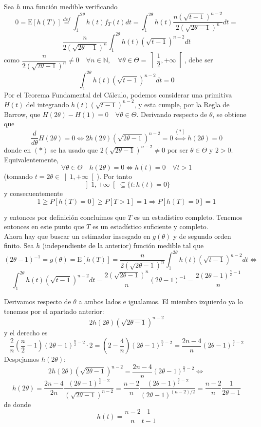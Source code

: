 \documentclass[12pt]{article}
\newcommand{\E}{\mathrm{E}}
\newcommand{\N}{\mathbb{N}}
\begin{document}
\begin{ejercicio}[2,25 puntos]
\begin{enumerate}
            Sea $h$ una función medible verificando $$0 = \E[h(T)] \stackrel{def}{=} \int_{1}^{2 \theta} h(t) f_T(t) dt = 
            \int_{1}^{2 \theta} h(t) \dfrac{n(\sqrt{t-1})^{n-2}}{2(\sqrt{2\theta-1})^{n}} dt =$$
            $$\dfrac{n}{2(\sqrt{2\theta-1})^{n}} \int_{1}^{2 \theta} h(t) (\sqrt{t-1})^{n-2} dt$$
            como $\dfrac{n}{2(\sqrt{2\theta-1})^{n}} \neq 0 \quad \forall n \in \N, \quad \forall \theta \in \Theta = \left] \dfrac{1}{2}, +\infty \right[$, debe ser
            $$\int_{1}^{2 \theta} h(t) (\sqrt{t-1})^{n-2} dt = 0$$
            Por el Teorema Fundamental del Cálculo, podemos considerar una primitiva $H(t)$ del integrando $h(t) (\sqrt{t-1})^{n-2}$, y esta cumple,
            por la Regla de Barrow, que $H(2 \theta) - H(1) = 0 \quad \forall \theta \in \Theta$. Derivando respecto de $\theta$, se obtiene que
            $$\dfrac{d}{d \theta}H(2 \theta) = 0 \iff 2 h(2 \theta) (\sqrt{2\theta-1})^{n-2} = 0 \stackrel{(*)}{\iff} h(2\theta) = 0$$
            donde en $(*)$ se ha usado que $2(\sqrt{2\theta-1})^{n-2} \neq 0$ por ser $\theta \in \Theta$ y $2 > 0$. Equivalentemente, $$\forall \theta \in \Theta \quad h(2 \theta) = 0 \iff h(t) = 0 \quad \forall t > 1$$ (tomando $t = 2 \theta \in \left]1, +\infty \right[$).
            Por tanto $$\left]1, +\infty \right[ \subseteq \{t : h(t) = 0\}$$ y consecuentemente $$1 \geqslant P[h(T) = 0] \geqslant P[T > 1] = 1
            \Longrightarrow P[h(T) = 0] = 1$$

            y entonces por definición concluimos que $T$ es un estadístico completo. Tenemos entonces en este punto
            que $T$ es un estadístico suficiente y completo. \\

            Ahora hay que buscar un estimador insesgado en $g(\theta)$ y de segundo orden finito. Sea $h$ (independiente de la anterior) función medible tal que
            $$(2 \theta-1)^{-1} = g(\theta) = \E[h(T)] = \dfrac{n}{2(\sqrt{2\theta-1})^{n}} \int_{1}^{2 \theta} h(t) (\sqrt{t-1})^{n-2} dt \iff$$
            $$\int_{1}^{2 \theta} h(t) (\sqrt{t-1})^{n-2} dt = \dfrac{2(\sqrt{2\theta-1})^{n}}{n} (2\theta-1)^{-1} = \dfrac{2(2\theta-1)^{\frac{n}{2}-1}}{n} $$

            Derivamos respecto de $\theta$ a ambos lados e igualamos. El miembro izquierdo ya lo tenemos por el apartado anterior:
            $$2 h(2 \theta) (\sqrt{2\theta-1})^{n-2}$$
            y el derecho es 
            $$\dfrac{2}{n}\left( \dfrac{n}{2} - 1 \right)(2\theta-1)^{\frac{n}{2}-2} \cdot 2 = \left( 2 - \dfrac{4}{n} \right) (2\theta-1)^{\frac{n}{2}-2} = 
            \dfrac{2n-4}{n} (2\theta-1)^{\frac{n}{2}-2}$$
            Despejamos $h(2\theta)$:
            $$2 h(2 \theta) (\sqrt{2\theta-1})^{n-2} = \dfrac{2n-4}{n} (2\theta-1)^{\frac{n}{2}-2} \iff $$
            $$h(2\theta) = \dfrac{2n-4}{2n} \dfrac{(2\theta-1)^{\frac{n}{2}-2}}{(\sqrt{2\theta-1})^{n-2}} = 
            \dfrac{n-2}{n} \dfrac{(2\theta-1)^{\frac{n}{2}-2}}{(2\theta-1)^{(n-2)/2}} = \dfrac{n-2}{n} \dfrac{1}{2\theta-1}$$
            de donde
            $$h(t) = \dfrac{n-2}{n} \dfrac{1}{t-1}$$


\end{enumerate}
\end{ejercicio}
\end{document}
